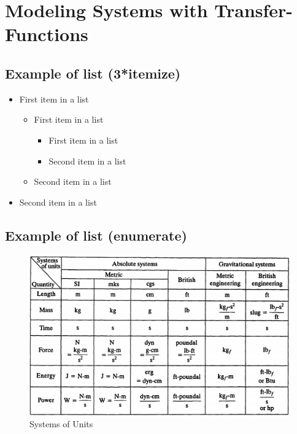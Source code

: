 \documentclass[paper=a4, fontsize=11pt]{scrartcl} %
\numberwithin{equation}{section} %
\numberwithin{figure}{section} %
\numberwithin{table}{section} %
\begin{document}

\section{Modeling Systems with Transfer-Functions}


\subsection{Example of list (3*itemize)}
\begin{itemize}
	\item First item in a list 
		\begin{itemize}
		\item First item in a list 
			\begin{itemize}
			\item First item in a list 
			\item Second item in a list 
			\end{itemize}
		\item Second item in a list 
		\end{itemize}
	\item Second item in a list 
\end{itemize}


\subsection{Example of list (enumerate)}



\begin{figure}
  \includegraphics[width=40em]{System_of_Units.png}
  \caption{Systems of Units}
  \label{fig:boat1}
\end{figure}
\end{document}
